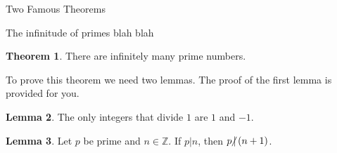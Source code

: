 \documentclass[11pt]{article}
\newcommand{\ndv}{\hspace{-4pt}\not|\hspace{2pt}}
\theoremstyle{definition}
\newtheorem{theorem}{Theorem}[section]
\newtheorem{lemma}[theorem]{Lemma}
\begin{document}
\begin{section}{Two Famous Theorems}
\begin{subsection}{The infinitude of primes}
blah blah

\begin{theorem}
\label{thm:infprimes}
There are infinitely many prime numbers.
\end{theorem}


To prove this theorem we need two lemmas. The proof of the first lemma is provided for you. 

\begin{lemma}
\label{lem:divisorsof1}
The only integers that divide $1$ are $1$ and $-1$.  
\end{lemma}


\begin{lemma}
\label{lem:plus1}
Let $p$ be prime and $n\in \mathbb{Z}$. If $p|n$, then $p\ndv (n+1)$.
\end{lemma}

%

\end{subsection}

\end{section}
\end{document}
